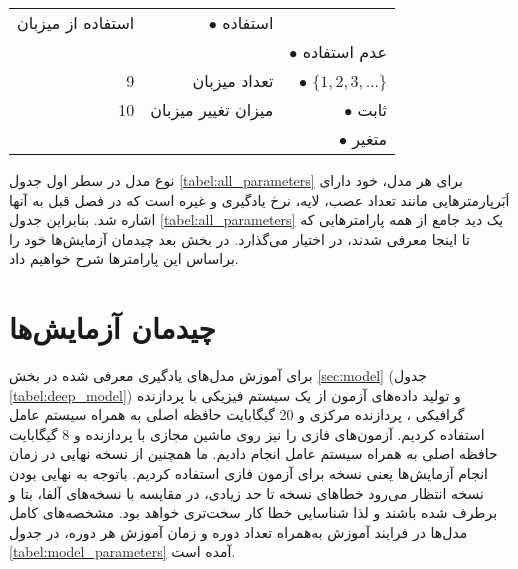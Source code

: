 \begin{table}
\begin{tabularx}{0.95\linewidth}{rrr}
		استفاده از میزبان &
		$\bullet$
		استفاده
		\\
		&
		&
		$\bullet$
		عدم استفاده 
		\\
		\hline
		 9 &  تعداد میزبان & 
		 $\bullet$ $\{1,2,3,...\}$
		\\
		\hline
		10 &
		میزان تغییر میزبان &
		$\bullet$
		ثابت
		\\
		&
		&
		$\bullet$
		متغیر
		\\
		\bottomrule[1.5pt]	
	\end{tabularx} 
\end{table}
 
 نوع مدل در سطر اول جدول \ref{tabel:all_parameters} برای هر مدل، خود دارای اَبَرپارمترهایی مانند تعداد عصب، لایه، نرخ یادگیری و غیره است که در فصل قبل به آنها اشاره شد. بنابراین جدول \ref{tabel:all_parameters} یک دید جامع از همه پارامترهایی که تا اینجا معرفی شدند، در اختیار می‌گذارد. در بخش بعد چیدمان آزمایش‌ها خود را براساس این پارامترها شرح خواهیم داد.
 
 

 \section{چیدمان آزمایش‌ها}
 
  برای آموزش مدل‌های یادگیری معرفی شده در بخش \ref{sec:model} (جدول \ref{tabel:deep_model}) و تولید داده‌های آزمون از یک سیستم فیزیکی با پردازنده گرافیکی 
  ،
  پردازنده مرکزی 
  و 20 گیگابایت حافظه اصلی به همراه سیستم عامل 
  استفاده کردیم. آزمون‌های فازی را نیز روی ماشین مجازی با پردازنده 
  و 8 گیگابایت حافظه اصلی به همراه سیستم عامل 
انجام دادیم. ما همچنین از نسخه نهایی 
در زمان انجام آزمایش‌ها یعنی نسخه 
برای آزمون فازی استفاده کردیم. باتوجه به نهایی بودن نسخه انتظار می‌رود خطاهای نسخه تا حد زیادی، در مقایسه با نسخه‌های آلفا، بتا و 
برطرف شده باشند و لذا شناسایی خطا کار سخت‌تری خواهد بود.
مشخصه‌های کامل مدل‌ها در فرایند آموزش به‌همراه تعداد دوره و زمان آموزش هر دوره، در جدول \ref{tabel:model_parameters} آمده است.


